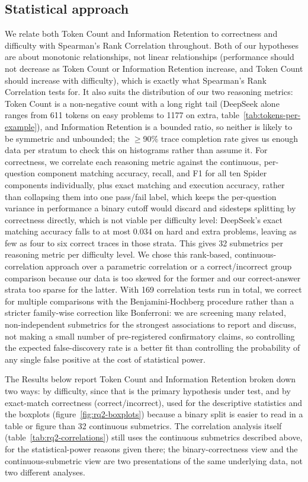 \subsection{Statistical approach}
\label{sec:rq2-statistical-approach}

We relate both Token Count and Information Retention to correctness and difficulty with Spearman's Rank Correlation throughout. Both of our hypotheses are about monotonic relationships, not linear relationships (performance should not decrease as Token Count or Information Retention increase, and Token Count should increase with difficulty), which is exactly what Spearman's Rank Correlation tests for. It also suits the distribution of our two reasoning metrics: Token Count is a non-negative count with a long right tail (DeepSeek alone ranges from 611 tokens on easy problems to 1177 on extra, table~\ref{tab:tokens-per-example}), and Information Retention is a bounded ratio, so neither is likely to be symmetric and unbounded; the $\geq$90\% trace completion rate gives us enough data per stratum to check this on histograms rather than assume it. For correctness, we correlate each reasoning metric against the continuous, per-question component matching accuracy, recall, and F1 for all ten Spider components individually, plus exact matching and execution accuracy, rather than collapsing them into one pass/fail label, which keeps the per-question variance in performance a binary cutoff would discard and sidesteps splitting by correctness directly, which is not viable per difficulty level: DeepSeek's exact matching accuracy falls to at most 0.034 on hard and extra problems, leaving as few as four to six correct traces in those strata. This gives 32 submetrics per reasoning metric per difficulty level. We chose this rank-based, continuous-correlation approach over a parametric correlation or a correct/incorrect group comparison because our data is too skewed for the former and our correct-answer strata too sparse for the latter. With 169 correlation tests run in total, we correct for multiple comparisons with the Benjamini-Hochberg procedure rather than a stricter family-wise correction like Bonferroni: we are screening many related, non-independent submetrics for the strongest associations to report and discuss, not making a small number of pre-registered confirmatory claims, so controlling the expected false-discovery rate is a better fit than controlling the probability of any single false positive at the cost of statistical power.

The Results below report Token Count and Information Retention broken down two ways: by difficulty, since that is the primary hypothesis under test, and by exact-match correctness (correct/incorrect), used for the descriptive statistics and the boxplots (figure~\ref{fig:rq2-boxplots}) because a binary split is easier to read in a table or figure than 32 continuous submetrics. The correlation analysis itself (table~\ref{tab:rq2-correlations}) still uses the continuous submetrics described above, for the statistical-power reasons given there; the binary-correctness view and the continuous-submetric view are two presentations of the same underlying data, not two different analyses.

